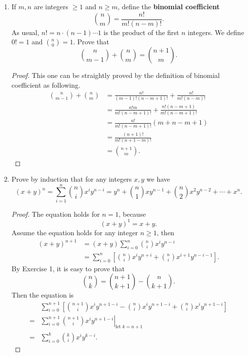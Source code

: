 \begin{enumerate}[1.]
	\item If $m,n$ are integers $\ge 1$ and $n \ge m$, define the \textbf{binomial coefficient}
	$$
	{n \choose m} = \frac{n!}{m!(n - m)!}.
	$$
	As usual, $n! = n \cdot (n - 1) \cdots 1$ is the product of the first $n$ integers. We define $0! = 1$ and ${n \choose 0} = 1$. Prove that
	$$
	{n \choose m - 1} + {n \choose m} = {n + 1 \choose m}.
	$$
	\begin{proof}
		This one can be straightly proved by the definition of binomial coefficient as following.
		$$
		\begin{aligned}
			{n \choose m - 1} + {n \choose m} &= \frac{n!}{(m - 1)! (n - m + 1)!} + \frac{n!}{m! (n - m)!} \\
			&= \frac{n! m}{m!(n - m + 1)!} + \frac{n!(n - m + 1)}{m!(n - m + 1)!} \\
			&= \frac{n!}{m!(n - m + 1)!}(m + n - m + 1) \\
			&= \frac{(n + 1)!}{m!(n + 1 - m)!} \\
			&= {n + 1 \choose m}.
		\end{aligned}
		$$
	\end{proof}
	
	
	\item Prove by induction that for any integers $x,y$ we have
	$$
	(x + y)^n = \sum_{i = 1}^n {n \choose i} x^i y^{n-i} = y^n + {n \choose 1}xy^{n-1} + {n \choose 2}x^2 y^{n-2} + \cdots + x^n.
	$$
	\begin{proof}
		The equation holds for $n = 1$, because
		$$
		(x + y)^1 = x + y.
		$$
		Assume the equation holds for any integer $n \ge 1$, then
		$$
		\begin{aligned}
			(x + y)^{n + 1} &= (x + y) \sum_{i = 0}^n {n \choose i}x^iy^{n - i} \\
			& = \sum_{i = 0}^n \left[ {n \choose i} x^iy^{n + i} + {n \choose i} x^{i + 1}y^{n - i - 1} \right].
		\end{aligned}
		$$
		By Exercise 1, it is easy to prove that
		$$
		{n \choose k} = {n + 1 \choose k + 1} - {n \choose k + 1}.
		$$
		Then the equation is
		$$
		\begin{aligned}
			&\sum_{i = 0}^{n + 1} \left[ {n + 1 \choose i} x^i y^{n + 1 - i} - {n \choose i} x^iy^{n + 1 - i} + {n \choose i} x^i y^{n + 1 - i} \right]\\
			=& \left. \sum_{i = 0}^{n + 1}{n + 1 \choose i}x^i y^{n + 1 - i} \right|_{\text{let $k = n + 1$}} \\
			=& \sum_{i = 0}^k {k \choose i} x^i y^{k - i}.
		\end{aligned}
		$$
	\end{proof}
	

\end{enumerate}
